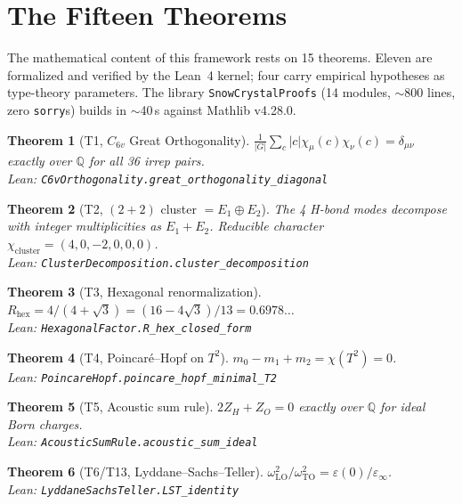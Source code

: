 \documentclass[11pt,a4paper]{article}
\newtheorem{theorem}{Theorem}
\begin{document}
\section{The Fifteen Theorems}
\label{sec:lean}

The mathematical content of this framework rests on 15 theorems. Eleven are formalized and verified by the Lean~4 kernel; four carry empirical hypotheses as type-theory parameters. The library \texttt{SnowCrystalProofs} (14 modules, $\sim$800 lines, zero \texttt{sorry}s) builds in $\sim$40\,s against Mathlib v4.28.0.

\begin{theorem}[T1, $C_{6v}$ Great Orthogonality]\label{thm:T1}
$\frac{1}{|G|}\sum_c |c|\chi_\mu(c)\chi_\nu(c) = \delta_{\mu\nu}$ exactly over $\mathbb{Q}$ for all 36 irrep pairs.\\
{\small\emph{Lean: \texttt{C6vOrthogonality.great\_orthogonality\_diagonal}}}
\end{theorem}

\begin{theorem}[T2, $(2{+}2)$ cluster $= E_1 \oplus E_2$]\label{thm:T2}
The 4 H-bond modes decompose with integer multiplicities as $E_1 + E_2$. Reducible character $\chi_\text{cluster} = (4, 0, -2, 0, 0, 0)$.\\
{\small\emph{Lean: \texttt{ClusterDecomposition.cluster\_decomposition}}}
\end{theorem}

\begin{theorem}[T3, Hexagonal renormalization]\label{thm:T3}
$R_\text{hex} = 4/(4+\sqrt{3}) = (16-4\sqrt{3})/13 = 0.6978\ldots$\\
{\small\emph{Lean: \texttt{HexagonalFactor.R\_hex\_closed\_form}}}
\end{theorem}

\begin{theorem}[T4, Poincaré–Hopf on $T^2$]\label{thm:T4}
$m_0 - m_1 + m_2 = \chi(T^2) = 0$.\\
{\small\emph{Lean: \texttt{PoincareHopf.poincare\_hopf\_minimal\_T2}}}
\end{theorem}

\begin{theorem}[T5, Acoustic sum rule]\label{thm:T5}
$2 Z_H + Z_O = 0$ exactly over $\mathbb{Q}$ for ideal Born charges.\\
{\small\emph{Lean: \texttt{AcousticSumRule.acoustic\_sum\_ideal}}}
\end{theorem}

\begin{theorem}[T6/T13, Lyddane–Sachs–Teller]\label{thm:T6}
$\omega_\text{LO}^2/\omega_\text{TO}^2 = \varepsilon(0)/\varepsilon_\infty$.\\
{\small\emph{Lean: \texttt{LyddaneSachsTeller.LST\_identity}}}
\end{theorem}
\end{document}
